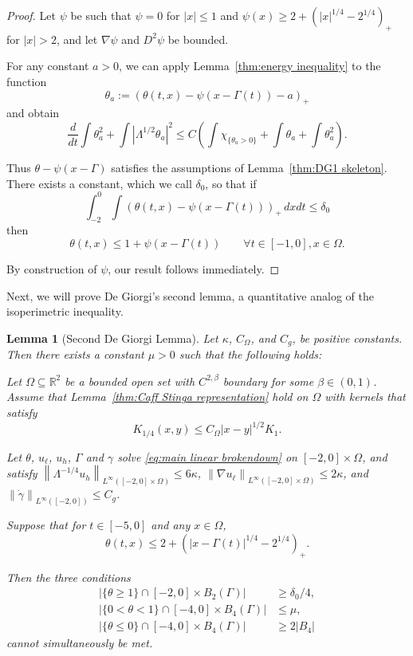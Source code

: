 \documentclass[11pt]{amsart}
\newtheorem{lemma}[theorem]{Lemma}
\theoremstyle{remark}
\theoremstyle{definition}
\newcommand{\R}{\mathbb{R}}
\newcommand{\norm}[1]{\left\lVert#1\right\rVert}
\newcommand{\paren}[1]{\left( #1 \right)}
\newcommand{\abs}[1]{\left\lvert #1 \right\rvert}
\newcommand{\grad}{\nabla}
\newcommand{\ddt}{\frac{d}{dt}}
\newcommand{\indic}[1]{\chi_{\{#1\}}}
\newcommand{\ulow}{u_\ell}
\newcommand{\uhigh}{u_h}
\newcommand{\Cgamma}{C_g}
\newcommand{\Comega}{C_\Omega}
\begin{document}
\begin{proof}
Let $\psi$ be such that $\psi = 0$ for $|x| \leq 1$ and $\psi(x) \geq 2 + \paren{|x|^{1/4}-2^{1/4}}_+$ for $|x|>2$, and let $\grad \psi$ and $D^2 \psi$ be bounded.  

For any constant $a > 0$, we can apply Lemma~\ref{thm:energy inequality} to the function
\[ \theta_a := (\theta(t,x) - \psi(x - \Gamma(t)) - a)_+ \]
and obtain
\[ \ddt \int \theta_a^2 + \int \abs{\Lambda^{1/2} \theta_a}^2 \leq C \paren{ \int \indic{\theta_a > 0} + \int \theta_a + \int \theta_a^2 }. \]

Thus $\theta - \psi(x-\Gamma)$ satisfies the assumptions of Lemma~\ref{thm:DG1 skeleton}.  There exists a constant, which we call $\delta_0$, so that if
\[ \int_{-2}^0 \int \paren{\theta(t,x) - \psi(x-\Gamma(t))}_+ \,dxdt \leq \delta_0 \]
then 
\[ \theta(t,x) \leq 1 + \psi(x-\Gamma(t)) \qquad \forall t \in [-1,0], x \in \Omega. \]

By construction of $\psi$, our result follows immediately.  

\end{proof}

Next, we will prove De Giorgi's second lemma, a quantitative analog of the isoperimetric inequality.  

\begin{lemma}[Second De Giorgi Lemma] \label{thm:DG2}
Let $\kappa$, $\Comega$, and $\Cgamma$, be positive constants. Then there exists a constant $\mu>0$ such that the following holds:

Let $\Omega \subseteq \R^2$ be a bounded open set with $C^{2,\beta}$ boundary for some $\beta \in (0,1)$.  Assume that Lemma~\ref{thm:Caff Stinga representation} hold on $\Omega$ with kernels that satisfy
\[ K_{1/4}(x,y) \leq \Comega |x-y|^{1/2} K_{1}. \]

Let $\theta$, $\ulow$, $\uhigh$, $\Gamma$ and $\gamma$ solve \eqref{eq:main linear brokendown} on $[-2,0]\times\Omega$, and satisfy $\norm{\Lambda^{-1/4} \uhigh}_{L^\infty([-2,0]\times\Omega)} \leq 6 \kappa$, $\norm{\grad \ulow}_{L^\infty([-2,0]\times\Omega)} \leq 2\kappa$, and $\norm{\dot{\gamma}}_{L^\infty([-2,0])} \leq \Cgamma$.  

Suppose that for $t \in [-5,0]$ and any $x \in \Omega$,
\[ \theta(t,x) \leq 2 + \paren{|x-\Gamma(t)|^{1/4}-2^{1/4}}_+. \]

Then the three conditions
\begin{align} 
\abs{\{\theta \geq 1\} \cap [-2,0]\times B_2(\Gamma)} &\geq \delta_0/4, \label{mass assumption above} \\
\abs{\{0 < \theta < 1\} \cap [-4,0]\times B_4(\Gamma)} &\leq \mu, \nonumber \\
\abs{\{\theta \leq 0\} \cap [-4,0]\times B_4(\Gamma)} &\geq 2 |B_4| \label{mass assumption below}
\end{align}
cannot simultaneously be met.  
\end{lemma}
\end{document}
